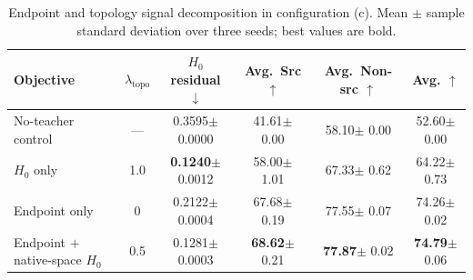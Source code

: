\begin{table}[H]
    \centering
    \caption{Endpoint and topology signal decomposition in configuration (c).
    Mean $\pm$ sample standard deviation over three seeds; best values are bold.}
    \label{tab:signal-decomposition}
    \small
    \newcommand{\deccell}[2]{#1{\tiny $\pm$ #2}}
    \setlength{\tabcolsep}{5pt}
    \begin{tabular}{@{}lccccc@{}}
        \toprule
        Objective & $\lambda_{\mathrm{topo}}$
        & $H_0$ residual $\downarrow$ & Avg.~Src $\uparrow$
        & Avg.~Non-src $\uparrow$ & Avg. $\uparrow$ \\
        \midrule
        No-teacher control & --- & \deccell{0.3595}{0.0000}
        & \deccell{41.61}{0.00} & \deccell{58.10}{0.00} & \deccell{52.60}{0.00} \\
        $H_0$ only & 1.0 & \deccell{\textbf{0.1240}}{0.0012}
        & \deccell{58.00}{1.01} & \deccell{67.33}{0.62} & \deccell{64.22}{0.73} \\
        \midrule
        Endpoint only & 0 & \deccell{0.2122}{0.0004}
        & \deccell{67.68}{0.19} & \deccell{77.55}{0.07} & \deccell{74.26}{0.02} \\
        Endpoint $+$ native-space $H_0$ & 0.5
        & \deccell{0.1281}{0.0003} & \deccell{\textbf{68.62}}{0.21}
        & \deccell{\textbf{77.87}}{0.02} & \deccell{\textbf{74.79}}{0.06} \\
        \bottomrule
    \end{tabular}
\end{table}
